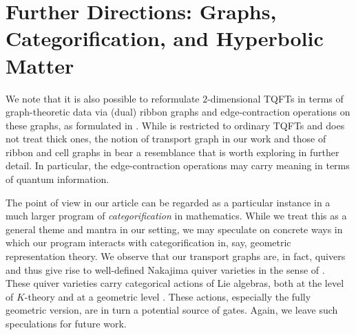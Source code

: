 \documentclass{amsart}
\numberwithin{thm}{section}
\theoremstyle{definition}
\begin{document}
\section{Further Directions: Graphs, Categorification, and Hyperbolic Matter}

We note that it is also possible to reformulate $2$-dimensional TQFTs in terms of graph-theoretic data via (dual) ribbon graphs and edge-contraction operations on these graphs, as formulated in \cite{DM}.  While \cite{DM} is restricted to ordinary TQFTs and does not treat thick ones, the notion of transport graph in our work and those of ribbon and cell graphs in \cite{DM} bear a resemblance that is worth exploring in further detail.  In particular, the edge-contraction operations may carry meaning in terms of quantum information.

The point of view in our article can be regarded as a particular instance in a much larger program of \emph{categorification} in mathematics.  While we treat this as a general theme and mantra in our setting, we may speculate on concrete ways in which our program interacts with categorification in, say, geometric representation theory.  We observe that our transport graphs are, in fact, quivers and thus give rise to well-defined Nakajima quiver varieties in the sense of \cite{HN1}.  These quiver varieties carry categorical actions of Lie algebras, both at the level of $K$-theory \cite{HN2} and at a geometric level \cite{CKL}.  These actions, especially the fully geometric version, are in turn a potential source of gates.  Again, we leave such speculations for future work.
\end{document}
